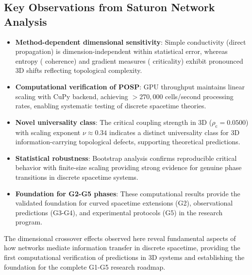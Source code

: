 \subsection{Key Observations from Saturon Network Analysis}
\begin{itemize}
\item \textbf{Method-dependent dimensional sensitivity}: Simple conductivity 
(direct \saturon{} propagation) is dimension-independent within statistical error, 
whereas entropy (\saturon{} coherence) and gradient measures (\saturon{} criticality) 
exhibit pronounced 3D shifts reflecting topological complexity.

\item \textbf{Computational verification of POSP}: GPU throughput maintains linear 
scaling with CuPy backend, achieving $>270,000$ \saturon{} cells/second processing 
rates, enabling systematic testing of discrete spacetime theories.

\item \textbf{Novel universality class}: The critical \saturon{} coupling strength 
in 3D ($\rho_{\mathrm{c}}=0.0500$) with scaling exponent $\nu \approx 0.34$ 
indicates a distinct universality class for 3D information-carrying topological 
defects, supporting \posp{} theoretical predictions.

\item \textbf{Statistical robustness}: Bootstrap analysis confirms reproducible 
\saturon{} critical behavior with finite-size scaling providing strong evidence 
for genuine phase transitions in discrete spacetime systems.

\item \textbf{Foundation for G2-G5 phases}: These computational results provide 
the validated foundation for curved spacetime extensions (G2), observational 
predictions (G3-G4), and experimental protocols (G5) in the \saturon{} research program.
\end{itemize}

The dimensional crossover effects observed here reveal fundamental aspects of 
how \saturon{} networks mediate information transfer in discrete spacetime, 
providing the first computational verification of \posp{} predictions in 3D 
systems and establishing the foundation for the complete G1-G5 research roadmap.


